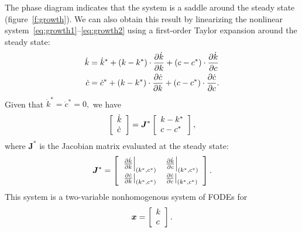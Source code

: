\documentclass[letterpaper,12pt,leqno]{article}
\begin{document}
The phase diagram indicates that the system is a saddle around the steady state (figure~\ref{f:growth}). We can also obtain this result by linearizing the nonlinear system~\eqref{eq:growth1}--\eqref{eq:growth2} using a first-order Taylor expansion around the steady state:
\begin{align*}
\dot{k} &=\dot{k}^{*} +\left( k-k^{*} \right) \cdot \frac{\partial \dot{k}}{\partial k}+\left( c-c^{*} \right)\cdot \frac{\partial \dot{k}}{\partial c} \\
\dot{c} &=\dot{c}^{*} +\left( k-k^{*} \right)\cdot  \frac{\partial \dot{c}}{\partial k}+\left( c-c^{*} \right)\cdot \frac{\partial \dot{c}}{\partial c}.
\end{align*}
Given that $\dot{k}^{*} =\dot{c}^{*} =0,$ we have 
\begin{equation*}
\left[ \begin{array}{l}
\dot{k}\\ 
\dot{c}
\end{array} \right] =\bm{J}^{*}\left[ 
\begin{array}{l}
k-k^{*} \\ 
c-c^{*}
\end{array} \right],
\end{equation*}
where $\bm{J}^{*}$ is the Jacobian matrix evaluated at the steady state:
\begin{equation*}
\bm{J}^{*}=\left[ 
\begin{array}{ll}
\left.\frac{\partial \dot{k}}{\partial k}\right\vert_{(k^{*},c^{*})}  & \left.\frac{\partial \dot{k}}{\partial c}\right\vert_{(k^{*},c^{*})} \\ 
\left.\frac{\partial \dot{c}}{\partial k}\right\vert_{(k^{*},c^{*})} & \left.\frac{\partial \dot{c}}{\partial c}\right\vert_{(k^{*},c^{*})}
\end{array} \right].
\end{equation*}
This system is a two-variable nonhomogenous system of FODEs
for \[\bm{x}=\left[ \begin{array}{l}
k\\ 
c
\end{array} \right].\]
\end{document}
